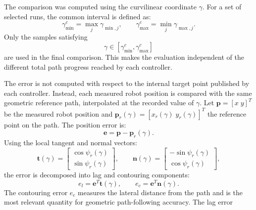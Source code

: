  The comparison was computed using the curvilinear coordinate \(\gamma\).  For a
  set of selected runs, the common interval is defined as:
  \begin{equation}
      \gamma_{\min}^{c}
      =
      \max_j \gamma_{\min,j},
      \qquad
      \gamma_{\max}^{c}
      =
      \min_j \gamma_{\max,j}.
  \end{equation}
  Only the samples satisfying
  \begin{equation}
      \gamma \in
      \left[
          \gamma_{\min}^{c},
          \gamma_{\max}^{c}
      \right]
  \end{equation}
  are used in the final comparison.  This makes the evaluation independent of the
  different total path progress reached by each controller.

  The error is not computed with respect to the internal target point published by
  each controller.  Instead, each measured robot position is compared with the same
  geometric reference path, interpolated at the recorded value of \(\gamma\).  Let
  \(\mathbf{p}=[x\;y]^T\) be the measured robot position and
  \(\mathbf{p}_r(\gamma)=[x_r(\gamma)\;y_r(\gamma)]^T\) the reference point on the
  path.  The position error is:
  \begin{equation}
      \mathbf{e}
      =
      \mathbf{p}
      -
      \mathbf{p}_r(\gamma).
  \end{equation}
  Using the local tangent and normal vectors:
  \begin{equation}
      \mathbf{t}(\gamma)
      =
      \begin{bmatrix}
          \cos\psi_r(\gamma) \\
          \sin\psi_r(\gamma)
      \end{bmatrix},
      \qquad
      \mathbf{n}(\gamma)
      =
      \begin{bmatrix}
          -\sin\psi_r(\gamma) \\
          \cos\psi_r(\gamma)
      \end{bmatrix},
  \end{equation}
  the error is decomposed into lag and contouring components:
  \begin{equation}
      e_l
      =
      \mathbf{e}^T \mathbf{t}(\gamma),
      \qquad
      e_c
      =
      \mathbf{e}^T \mathbf{n}(\gamma).
  \end{equation}
  The contouring error \(e_c\) measures the lateral distance from the path and is
  the most relevant quantity for geometric path-following accuracy.  The lag error
